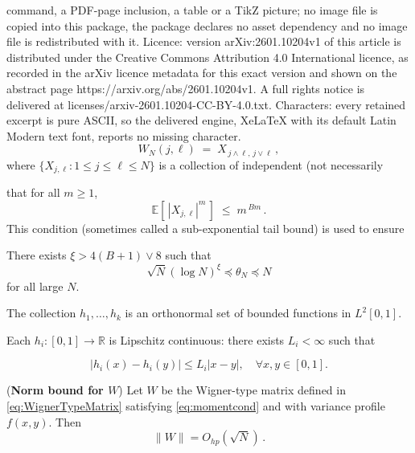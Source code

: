\documentclass[10pt,a4paper]{amsart}
\begin{document}
command, a PDF-page inclusion, a table or a TikZ picture; no image file is copied into this package, the package declares no asset dependency and no image file is redistributed with it. Licence: version arXiv:2601.10204v1 of this article is distributed under the Creative Commons Attribution 4.0 International licence, as recorded in the arXiv licence metadata for this exact version and shown on the abstract page https://arxiv.org/abs/2601.10204v1. A full rights notice is delivered at licenses/arxiv-2601.10204-CC-BY-4.0.txt. Characters: every retained excerpt is pure ASCII, so the delivered engine, XeLaTeX with its default Latin Modern text font, reports no missing character.
\begin{equation}\label{eq:WignerTypeMatrix} W_N(j,\ell) \;=\; X_{\,j \wedge \ell,\, j \vee \ell}\,,
\end{equation} where $\{X_{j,\ell}: 1 \le j \le \ell \le N\}$ is a collection of independent (not necessarily

that for all $m \ge 1$, \begin{equation}\label{eq:momentcond} \mathbb{E}[\,|X_{j,\ell}|^m\,] \;\le\; m^{\,B
m}\,. \end{equation} This condition (sometimes called a sub-exponential tail bound) is used to ensure

\begin{assumption}\label{assump:A1}
There exists $\xi > 4(B+1) \vee 8$ such that
\[
\sqrt{N}(\log N)^{\xi} \preceq \theta_N \preceq N
\]
for all large $N$.
\end{assumption}

\begin{assumption}[{\bf Orthogonality of \(h_i\)}]\label{assump:A2}
    The collection ${h_1,\ldots,h_k}$ is an orthonormal set of bounded functions in $L^2[0,1]$. 
\end{assumption}

\begin{assumption}[{\bf Regularity of $h_i$}]\label{assump:A3} Each $h_i: [0,1]\to\mathbb R$ is Lipschitz continuous: there exists $L_i < \infty$ such that

\[
        |h_i(x) - h_i(y)| \leq L_i |x - y|, \quad \forall x, y \in [0,1].
    \]

\end{assumption}

\begin{lemma}({\bf Norm bound for $W$})\label{lemma:NormBound} Let $W$ be the Wigner-type matrix defined in \eqref{eq:WignerTypeMatrix} satisfying \eqref{eq:momentcond} and with variance profile $f(x,y)$. Then \[
\|W\| = O_{hp}(\sqrt{N})\,.
\]
\end{lemma}
\end{document}
